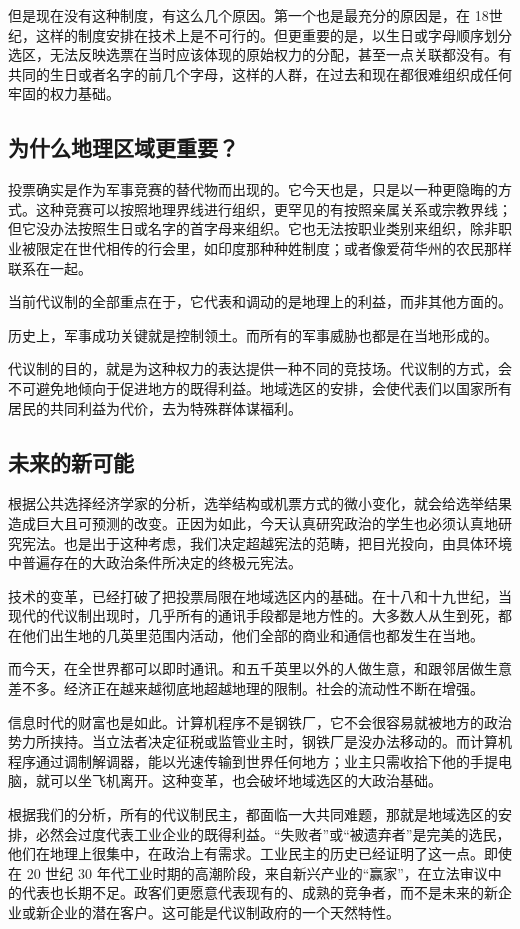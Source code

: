 但是现在没有这种制度，有这么几个原因。第一个也是最充分的原因是，在 18世纪，这样的制度安排在技术上是不可行的。但更重要的是，以生日或字母顺序划分选区，无法反映选票在当时应该体现的原始权力的分配，甚至一点关联都没有。有共同的生日或者名字的前几个字母，这样的人群，在过去和现在都很难组织成任何牢固的权力基础。

\subsection{为什么地理区域更重要？}
投票确实是作为军事竞赛的替代物而出现的。它今天也是，只是以一种更隐晦的方式。这种竞赛可以按照地理界线进行组织，更罕见的有按照亲属关系或宗教界线；但它没办法按照生日或名字的首字母来组织。它也无法按职业类别来组织，除非职业被限定在世代相传的行会里，如印度那种种姓制度；或者像爱荷华州的农民那样联系在一起。

当前代议制的全部重点在于，它代表和调动的是地理上的利益，而非其他方面的。

历史上，军事成功关键就是控制领土。而所有的军事威胁也都是在当地形成的。

代议制的目的，就是为这种权力的表达提供一种不同的竞技场。代议制的方式，会不可避免地倾向于促进地方的既得利益。地域选区的安排，会使代表们以国家所有居民的共同利益为代价，去为特殊群体谋福利。

\subsection{未来的新可能}
根据公共选择经济学家的分析，选举结构或机票方式的微小变化，就会给选举结果造成巨大且可预测的改变。正因为如此，今天认真研究政治的学生也必须认真地研究宪法。也是出于这种考虑，我们决定超越宪法的范畴，把目光投向，由具体环境中普遍存在的大政治条件所决定的终极元宪法。

技术的变革，已经打破了把投票局限在地域选区内的基础。在十八和十九世纪，当现代的代议制出现时，几乎所有的通讯手段都是地方性的。大多数人从生到死，都在他们出生地的几英里范围内活动，他们全部的商业和通信也都发生在当地。

而今天，在全世界都可以即时通讯。和五千英里以外的人做生意，和跟邻居做生意差不多。经济正在越来越彻底地超越地理的限制。社会的流动性不断在增强。

信息时代的财富也是如此。计算机程序不是钢铁厂，它不会很容易就被地方的政治势力所挟持。当立法者决定征税或监管业主时，钢铁厂是没办法移动的。而计算机程序通过调制解调器，能以光速传输到世界任何地方；业主只需收拾下他的手提电脑，就可以坐飞机离开。这种变革，也会破坏地域选区的大政治基础。

根据我们的分析，所有的代议制民主，都面临一大共同难题，那就是地域选区的安排，必然会过度代表工业企业的既得利益。“失败者”或“被遗弃者”是完美的选民，他们在地理上很集中，在政治上有需求。工业民主的历史已经证明了这一点。即使在 20 世纪 30 年代工业时期的高潮阶段，来自新兴产业的“赢家”，在立法审议中的代表也长期不足。政客们更愿意代表现有的、成熟的竞争者，而不是未来的新企业或新企业的潜在客户。这可能是代议制政府的一个天然特性。

